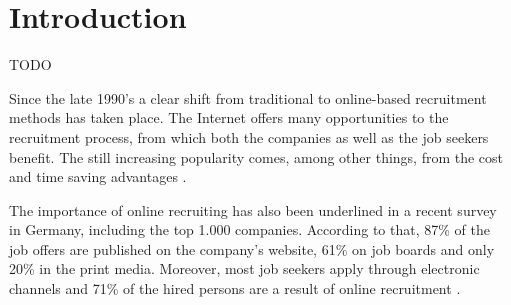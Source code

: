 
%
%

\chapter{Introduction}

TODO

Since the late 1990's a clear shift from traditional to online-based recruitment methods has taken place. The Internet offers many opportunities to the recruitment process, from which both the companies as well as the job seekers benefit. The still increasing popularity comes, among other things, from the cost and time saving advantages \cite{Meert06clustermaps}.

The importance of online recruiting has also been underlined in a recent survey in Germany, including the top 1.000 companies. According to that, 87\% of the job offers are published on the company's website, 61\% on job boards and only 20\% in the print media. Moreover, most job seekers apply through electronic channels and 71\% of the hired persons are a result of online recruitment \cite{Meert06clustermaps}.

